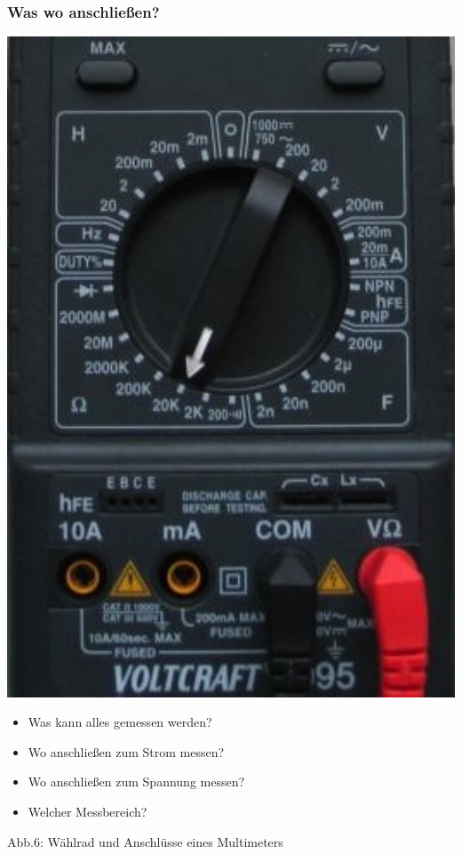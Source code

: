 \begin{frame}
    \frametitle{Was wo anschließen?}
	\begin{minipage}{0.4\textwidth}
        \includegraphics[width=1\textwidth]{a16/digitalmultimeterMess.jpg}
	\end{minipage}
	\begin{minipage}{0.4\textwidth}	
	\begin{itemize}
		\item Was kann alles gemessen werden?
		\item Wo anschließen zum Strom messen?
		\item Wo anschließen zum Spannung messen?
		\item Welcher Messbereich?
	\end{itemize}
	\end{minipage}
	\vspace{3mm}
	Abb.6: Wählrad und Anschlüsse eines Multimeters \cite{wmde}
\end{frame}

